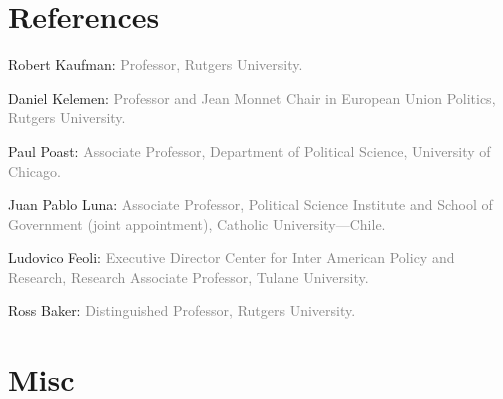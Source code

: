 \documentclass[letterpaper]{article}
\renewenvironment{itemize}{
  \begin{list}{}{
    \setlength{\leftmargin}{1.5em}
  }
}{
  \end{list}
}
\begin{document}


\section*{References}
\begin{itemize}
\item[\textcolor{gray}{\textbullet}] Robert Kaufman: {\textcolor{gray}{\scriptsize Professor, Rutgers University.}}
\item[\textcolor{gray}{\textbullet}] Daniel Kelemen: {\textcolor{gray}{\scriptsize Professor and Jean Monnet Chair in European Union Politics, Rutgers University.}}
\item[\textcolor{gray}{\textbullet}] Paul Poast: {\textcolor{gray}{\scriptsize Associate Professor, Department of Political Science, University of Chicago.}}
\item[\textcolor{gray}{\textbullet}] Juan Pablo Luna: {\textcolor{gray}{\scriptsize Associate Professor, Political Science Institute and School of Government (joint appointment), Catholic University---Chile.}}
\item[\textcolor{gray}{\textbullet}] Ludovico Feoli: {\textcolor{gray}{\scriptsize Executive Director Center for Inter American Policy and Research, Research Associate Professor, Tulane University.}}
\item[\textcolor{gray}{\textbullet}] Ross Baker: {\textcolor{gray}{\scriptsize Distinguished Professor, Rutgers University.}}
\end{itemize}




\section*{Misc}
{\unskip}




\bigskip
\end{document}
